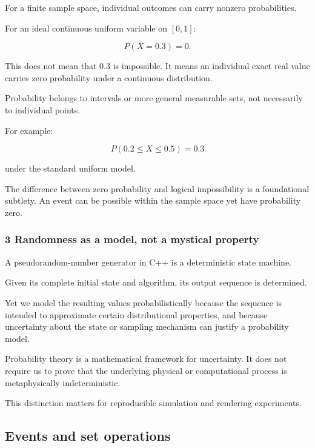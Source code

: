 \hypertarget{02-foundations-ii-ch023-discrete-versus-continuous-outcome-spaces}{}

For a finite sample space, individual outcomes can carry nonzero probabilities.

For an ideal continuous uniform variable on \([0,1]\):

\[
 P(X=0.3)=0.
\]

This does not mean that \(0.3\) is impossible. It means an individual exact real value carries zero probability under a continuous distribution.

Probability belongs to intervals or more general measurable sets, not necessarily to individual points.

For example:

\[
 P(0.2\le X\le0.5)=0.3
\]

under the standard uniform model.

The difference between zero probability and logical impossibility is a foundational subtlety. An event can be possible within the sample space yet have probability zero.

\subsubsection{3 Randomness as a model, not a mystical property}\label{02-foundations-ii-ch023-randomness-as-a-model-not-a-mystical-property}

\hypertarget{02-foundations-ii-ch023-randomness-as-a-model-not-a-mystical-property}{}

A pseudorandom-number generator in C++ is a deterministic state machine.

Given its complete initial state and algorithm, its output sequence is determined.

Yet we model the resulting values probabilistically because the sequence is intended to approximate certain distributional properties, and because uncertainty about the state or sampling mechanism can justify a probability model.

Probability theory is a mathematical framework for uncertainty. It does not require us to prove that the underlying physical or computational process is metaphysically indeterministic.

This distinction matters for reproducible simulation and rendering experiments.

\subsection{Events and set operations}\label{02-foundations-ii-ch023-events-and-set-operations}

